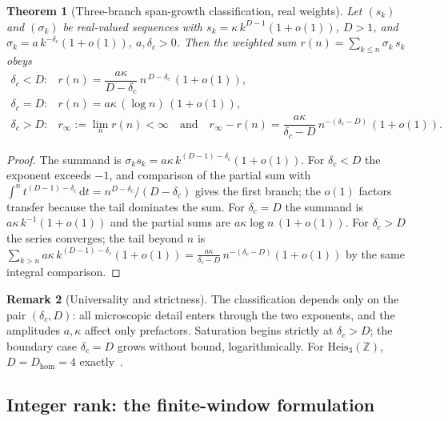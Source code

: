 \documentclass[11pt,a4paper]{article}
\newtheorem{theorem}{Theorem}[section]
\theoremstyle{definition}
\newtheorem{remark}[theorem]{Remark}
\newcommand{\Heis}{\mathrm{Heis}_3(\mathbb{Z})}
\newcommand{\dc}{\delta_c}
\newcommand{\Dhom}{D_{\mathrm{hom}}}
\begin{document}
\begin{theorem}[Three-branch span-growth classification, real weights]
  \label{thm:classification}
  Let $(s_k)$ and $(\sigma_k)$ be real-valued sequences with $s_k = \kappa\, k^{D-1}(1 + o(1))$, $D > 1$,
  and $\sigma_k = a\, k^{-\dc}(1 + o(1))$, $a, \dc > 0$.
  Then the weighted sum $r(n) = \sum_{k \le n} \sigma_k\, s_k$ obeys
  \[
    \begin{array}{ll}
      \dc < D: & r(n) = \dfrac{a\kappa}{D-\dc}\, n^{\,D-\dc}\,(1 + o(1)),\\[3mm]
      \dc = D: & r(n) = a\kappa\, (\log n)\,(1 + o(1)),\\[2mm]
      \dc > D: & r_\infty := \lim_n r(n) < \infty
        \quad\text{and}\quad
        r_\infty - r(n) = \dfrac{a\kappa}{\dc-D}\, n^{-(\dc-D)}\,(1 + o(1)).
    \end{array}
  \]
\end{theorem}

\begin{proof}
  The summand is $\sigma_k s_k = a\kappa\, k^{(D-1)-\dc}(1+o(1))$.
  For $\dc < D$ the exponent exceeds $-1$, and comparison of the partial sum with
  $\int^n t^{(D-1)-\dc}\,\mathrm{d}t = n^{D-\dc}/(D-\dc)$ gives the first branch; the $o(1)$ factors
  transfer because the tail dominates the sum.
  For $\dc = D$ the summand is $a\kappa\, k^{-1}(1+o(1))$ and the partial sums are
  $a\kappa \log n\,(1+o(1))$.
  For $\dc > D$ the series converges; the tail beyond $n$ is
  $\sum_{k > n} a\kappa\, k^{(D-1)-\dc}(1+o(1)) = \frac{a\kappa}{\dc-D}\, n^{-(\dc-D)}(1+o(1))$ by the same
  integral comparison.
\end{proof}

\begin{remark}[Universality and strictness]
  \label{rem:universality}
  The classification depends only on the pair $(\dc, D)$: all microscopic detail enters through the two
  exponents, and the amplitudes $a, \kappa$ affect only prefactors.
  Saturation begins strictly at $\dc > D$; the boundary case $\dc = D$ grows without bound, logarithmically.
  For $\Heis$, $D = \Dhom = 4$ exactly~\cite{Bass1972,Guivarch1973}.
\end{remark}

\subsection{Integer rank: the finite-window formulation}
\label{ssec:window}
\end{document}
